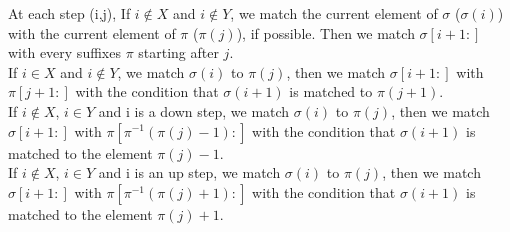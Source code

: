 \documentclass[12pt, a4paper]{article}
\newcommand{\ptext}{\pi}
\newcommand{\pmotif}{\sigma}
\newcommand{\x}{X}
\newcommand{\y}{Y}
\newcommand{\bmotif}{(\sigma,\x,\y)}
\newcommand{\dstep}{d}
\newcommand{\ustep}{u}
\begin{document}
%						
%							
						
			At each step (i,j),
			If $i \notin \x$ and $i \notin \y$,
			we match the current element of $\pmotif$ ($\pmotif(i)$)
			with the current element of $\ptext$ ($\ptext(j)$), if possible.
			Then we match $\pmotif[i+1:]$ with 
			every suffixes $\ptext$ starting after $j$.\\
			
			If $i \in \x$ and $i \notin \y$,
			we match $\pmotif(i)$ to $\ptext(j)$, 
			then we match $\pmotif[i+1:]$ with $\ptext[j+1:]$
			with the condition that
			$\pmotif(i+1)$ is matched to $\ptext(j+1)$.\\
			
			If $i \notin \x$, $i \in \y$ and i is a down step,
			we match $\pmotif(i)$ to $\ptext(j)$, 
			then we match $\pmotif[i+1:]$ 
			with $\ptext[\ptext^{-1}(\ptext(j)-1):]$
			with the condition that
			$\pmotif(i+1)$ is matched to the element $\ptext(j)-1$.\\						
			
			If $i \notin \x$, $i \in \y$ and i is an up step,
			we match $\pmotif(i)$ to $\ptext(j)$, 
			then we match $\pmotif[i+1:]$ 
			with $\ptext[\ptext^{-1}(\ptext(j)+1):]$
			with the condition that
			$\pmotif(i+1)$ is matched to the element $\ptext(j)+1$.\\	
\end{document}
